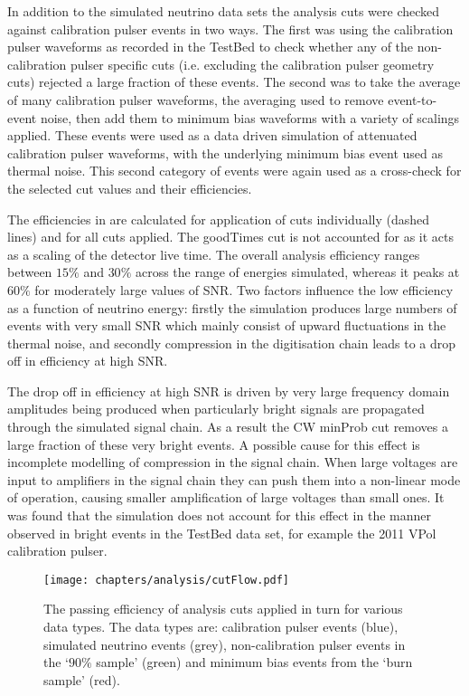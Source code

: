 In addition to the simulated neutrino data sets the analysis cuts were checked against calibration pulser events in two ways. The first was using the calibration pulser waveforms as recorded in the TestBed to check whether any of the non-calibration pulser specific cuts (i.e. excluding the calibration pulser geometry cuts) rejected a large fraction of these events. The second was to take the average of many calibration pulser waveforms, the averaging used to remove event-to-event noise, then add them to minimum bias waveforms with a variety of scalings applied. These events were used as a data driven simulation of attenuated calibration pulser waveforms, with the underlying minimum bias event used as thermal noise. This second category of events were again used as a cross-check for the selected cut values and their efficiencies.

The efficiencies in  are calculated for application of cuts individually (dashed lines) and for all cuts applied. The goodTimes cut is not accounted for as it acts as a scaling of the detector live time. The overall analysis efficiency ranges between $15 \%$ and $30 \%$ across the range of energies simulated, whereas it peaks at $60 \%$ for moderately large values of SNR. Two factors influence the low efficiency as a function of neutrino energy: firstly the simulation produces large numbers of events with very small SNR which mainly consist of upward fluctuations in the thermal noise, and secondly compression in the digitisation chain leads to a drop off in efficiency at high SNR. 

The drop off in efficiency at high SNR is driven by very large frequency domain amplitudes being produced when particularly bright signals are propagated through the simulated signal chain. As a result the CW minProb cut removes a large fraction of these very bright events. A possible cause for this effect is incomplete modelling of compression in the signal chain. When large voltages are input to amplifiers in the signal chain they can push them into a non-linear mode of operation, causing smaller amplification of large voltages than small ones. It was found that the simulation does not account for this effect in the manner observed in bright events in the TestBed data set, for example the 2011 VPol calibration pulser. 

\begin{figure}[hptb]
  \texttt{[image: chapters/analysis/cutFlow.pdf]}
  \caption{The passing efficiency of analysis cuts applied in turn for various data types. The data types are: calibration pulser events (blue), simulated neutrino events (grey), non-calibration pulser events in the `$90 \%$ sample' (green) and minimum bias events from the `burn sample' (red).}
  \label{fig:Analysis:Cut-Results:CutFlow}
\end{figure}

